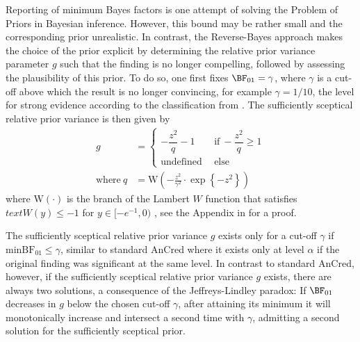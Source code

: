 Reporting of minimum Bayes factors is one attempt of solving the Problem of
Priors in Bayesian inference. However, this bound may be rather small and the
corresponding prior unrealistic. In contrast, the Reverse-Bayes approach makes
the choice of the prior explicit by determining the relative prior variance
parameter $g$ such that the finding is no longer compelling, followed by
assessing the plausibility of this prior. To do so, one first fixes
$\BF_{01} = \gamma$, where $\gamma$ is a cut-off above which the result is no
longer convincing, for example $\gamma = 1/10$, the level for strong evidence
according to the classification from \citet{Jeffreys1961}. The sufficiently
sceptical relative prior variance is then given by
\begin{align}
\label{ggamma}
  g &=
  \begin{cases}
    -\dfrac{z^2}{q} - 1
    & ~~ \text{if} ~
    -\dfrac{z^2}{q} \geq 1 \\
    \text{undefined} & ~~ \text{else}
  \end{cases} \\
  \text{where} ~ q &=
  \text{W} \left(-\frac{z^2}{\gamma^2} \cdot
  \exp\left\{-z^2\right\}\right)
  \nonumber
\end{align}
where $\text{W}(\cdot)$ is the branch of the Lambert $W$ function that satisfies
$text{W}(y) \leq -1$ for $y \in [-e^{-1}, 0)$ \citep{Corless1996}, see the
Appendix in \citep{Pawel2020b} for a proof.

The sufficiently sceptical relative prior variance $g$ exists only for a cut-off
$\gamma$ if $\text{minBF}_{01} \leq \gamma$, similar to standard AnCred where it
exists only at level $\alpha$ if the original finding was significant at the
same level. In contrast to standard AnCred, however, if the sufficiently
sceptical relative prior variance $g$ exists, there are always two solutions, a
consequence of the Jeffreys-Lindley paradox: If $\BF_{01}$ decreases in $g$
below the chosen cut-off $\gamma$, after attaining its minimum it will
monotonically increase and intersect a second time with $\gamma$, admitting a
second solution for the sufficiently sceptical prior.


